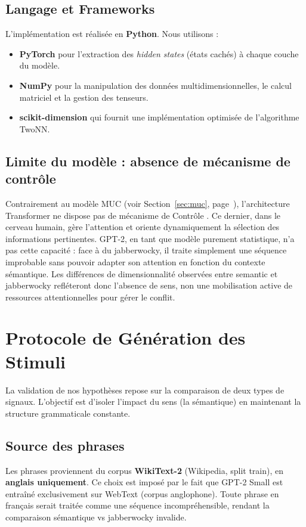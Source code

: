 \subsection{Langage et Frameworks}
L’implémentation est réalisée en \textbf{Python}. Nous utilisons :
\begin{itemize}
    \item \textbf{PyTorch} pour l’extraction des \textit{hidden states} (états cachés) à chaque couche du modèle.
    \item \textbf{NumPy} pour la manipulation des données multidimensionnelles, le calcul matriciel et la gestion des tenseurs.
    \item \textbf{scikit-dimension} qui fournit une implémentation optimisée de l'algorithme TwoNN.
\end{itemize}

\subsection{Limite du modèle : absence de mécanisme de contrôle}
Contrairement au modèle MUC (voir Section~\ref{sec:muc}, page~\pageref{sec:muc}), l'architecture Transformer ne dispose pas de mécanisme de \og Contrôle \fg. Ce dernier, dans le cerveau humain, gère l'attention et oriente dynamiquement la sélection des informations pertinentes. GPT-2, en tant que modèle purement statistique, n'a pas cette capacité : face à du jabberwocky, il traite simplement une séquence improbable sans pouvoir adapter son attention en fonction du contexte sémantique. Les différences de dimensionnalité observées entre semantic et jabberwocky refléteront donc l'absence de sens, non une mobilisation active de ressources attentionnelles pour gérer le conflit.

\section{Protocole de Génération des Stimuli}

La validation de nos hypothèses repose sur la comparaison de deux types de signaux. L’objectif est d’isoler l’impact du sens (la sémantique) en maintenant la structure grammaticale constante.

\subsection{Source des phrases}
Les phrases proviennent du corpus \textbf{WikiText-2} (Wikipedia, split train), en \textbf{anglais uniquement}. Ce choix est imposé par le fait que GPT-2 Small est entraîné exclusivement sur WebText (corpus anglophone). Toute phrase en français serait traitée comme une séquence incompréhensible, rendant la comparaison sémantique vs jabberwocky invalide.

